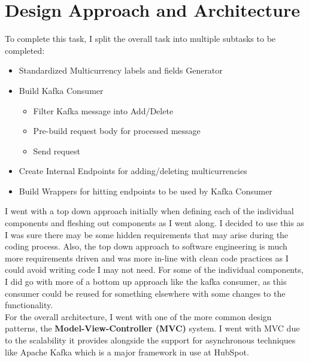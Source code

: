\section{Design Approach and Architecture}
To complete this task, I split the overall task into multiple subtasks to be completed:
\begin{itemize}
\item Standardized Multicurrency labels and fields Generator
\item Build Kafka Consumer
\begin{itemize}
\item Filter Kafka message into Add/Delete
\item Pre-build request body for processed message
\item Send request
\end{itemize}
\item Create Internal Endpoints for adding/deleting multicurrencies
\item Build Wrappers for hitting endpoints to be used by Kafka Consumer
\end{itemize}

I went with a top down approach initially when defining each of the individual components and fleshing out components as I went along. I decided to use this as I was sure there may be some hidden requirements that may arise during the coding process. Also, the top down approach to software engineering is much more requirements driven and was more in-line with clean code practices as I could avoid writing code I may not need. For some of the individual components, I did go with more of a bottom up approach like the kafka consumer, as this consumer could be reused for something elsewhere with some changes to the functionality. \newline \\ For the overall architecture, I went with one of the more common design patterns, the \textbf{Model-View-Controller (MVC)} system. I went with MVC due to the scalability it provides alongside the support for asynchronous techniques like Apache Kafka which is a major framework in use at HubSpot.

